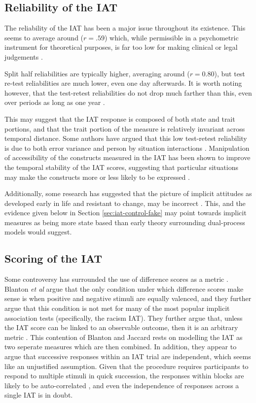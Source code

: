 \subsection{Reliability of the IAT}
\label{sec:reliability-iat}

The reliability of the IAT has been a major issue throughout its existence. This seems to average around ($r=.59$) which, while permissible in a psychometric instrument for theoretical purposes, is far too low for making clinical or legal judgements \cite{Greenwald2000, Blanton2006d}. 

Split half reliabilities are typically higher, averaging around ($r=0.80$), but test re-test reliabilities are much lower, even one day afterwards. It is worth noting however, that the test-retest reliabilities do not drop much farther than this, even over periods as long as one year \cite{Egloff2005}. 

This may suggest that the IAT response is composed of both state and trait portions, and that the trait portion of the measure is relatively invariant across temporal distance. Some authors have argued that this low test-retest reliability is due to both error variance and person by situation interactions \cite{Gschwendner2008}.  Manipulation of accessibility of the constructs measured in the IAT has been shown to improve the temporal stability of the IAT scores, suggesting that particular situations may make the constructs more or less likely to be expressed \cite{Gschwendner2008}. 

Additionally, some research has suggested that the picture of implicit attitudes as developed early in life and resistant to change, may be incorrect \cite{Gschwendner2008}. This, and the evidence given below in Section \ref{sec:iat-control-fake} may point towards implicit measures as being more state based than early theory surrounding dual-process models would suggest. 

\subsection{Scoring of the IAT}
\label{sec:scoring-iat}



Some controversy has surrounded the use of difference scores as a metric \cite{Blanton2006d}. Blanton \textit{et al} argue that the only condition under which difference scores make sense is when positive and negative stimuli are equally valenced, and they further argue that this condition is not met for many of the most popular implicit association tests (specifically, the racism IAT). They further argue that, unless the IAT score can be linked to an observable outcome, then it is an arbitrary metric \cite{Blanton2006}. This contention of Blanton and Jaccard rests on modelling the IAT as two seperate measures which are then combined. In addition, they appear to argue that successive responses within an IAT trial are independent, which seems like an unjustified assumption. Given that the procedure requires participants to respond to multiple stimuli in quick succession, the responses within blocks are likely to be auto-correlated \cite{mccleary1980applied}, and even the independence of responses across a single IAT is in doubt.

